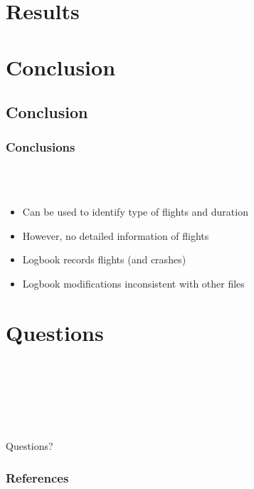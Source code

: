 \documentclass[t,ignorenonframetext]{beamer}
\begin{document}
\section[Results]{Results}
\begin{frame}
\end{frame}

\section{Conclusion}
\subsection{Conclusion}
\begin{frame}
\frametitle{Conclusions}~\\~\\
\begin{itemize}
\setlength{\itemsep}{10pt}\setlength{\itemsep}{5pt}
\item Can be used to identify type of flights and duration
\item However, no detailed information of flights
\item Logbook records flights (and crashes)
\item Logbook modifications inconsistent with other files
\end{itemize}
\end{frame}

\section[Questions]{Questions}
\begin{frame}
~ \\~ \\~ \\ ~ \\~ \\
\begin{center}\Huge Questions? \end{center} 
\end{frame}

\begin{frame}[allowframebreaks]
        \frametitle{References}
        
        
\end{frame}
\end{document}
